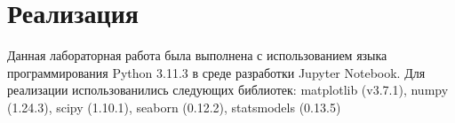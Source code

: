 \section{Реализация}
Данная лабораторная работа была выполнена с использованием языка программирования Python 3.11.3 в среде разработки Jupyter Notebook.
Для реализации использованились следующих библиотек: matplotlib (v3.7.1), numpy (1.24.3), scipy (1.10.1), seaborn (0.12.2), statsmodels (0.13.5)
